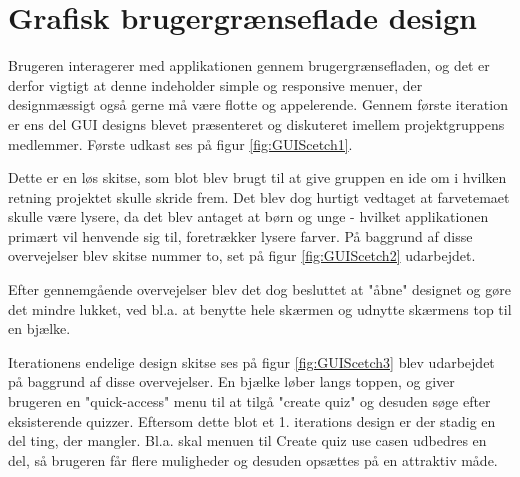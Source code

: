 \section{Grafisk brugergrænseflade design}
Brugeren interagerer med applikationen gennem brugergrænsefladen, og det er derfor vigtigt at denne indeholder simple og responsive menuer, der designmæssigt også gerne må være flotte og appelerende.  
Gennem første iteration er ens del GUI designs blevet præsenteret og diskuteret imellem projektgruppens medlemmer. Første udkast ses på figur \ref{fig:GUIScetch1}.


Dette er en løs skitse, som blot blev brugt til at give gruppen en ide om i hvilken retning projektet skulle skride frem. Det blev dog hurtigt vedtaget at farvetemaet skulle være lysere, da det blev antaget at børn og unge - hvilket applikationen primært vil henvende sig til, foretrækker lysere farver.
På baggrund af disse overvejelser blev skitse nummer to, set på figur \ref{fig:GUIScetch2} udarbejdet.


Efter gennemgående overvejelser blev det dog besluttet at "åbne" designet og gøre det mindre lukket, ved bl.a. at benytte hele skærmen og udnytte skærmens top til en bjælke.


Iterationens endelige design skitse ses på figur \ref{fig:GUIScetch3} blev udarbejdet på baggrund af disse overvejelser. En bjælke løber langs toppen, og giver brugeren en "quick-access" menu til at tilgå "create quiz" og desuden søge efter eksisterende quizzer. 
Eftersom dette blot et 1. iterations design er der stadig en del ting, der mangler. Bl.a. skal menuen til Create quiz use casen udbedres en del, så brugeren får flere muligheder og desuden opsættes på en attraktiv måde. 
